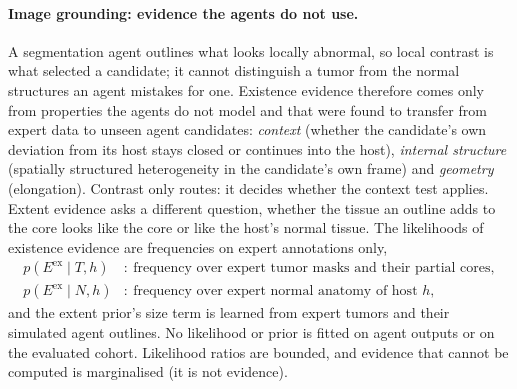 \documentclass[fleqn,10pt]{olplainarticle}
\begin{document}
\paragraph{Image grounding: evidence the agents do not use.}
A segmentation agent outlines what looks locally abnormal, so local contrast is what selected a candidate; it cannot
distinguish a tumor from the normal structures an agent mistakes for one. Existence evidence therefore comes only from
properties the agents do not model and that were found to transfer from expert data to unseen agent candidates:
\emph{context} (whether the candidate's own deviation from its host stays closed or continues into the host),
\emph{internal structure} (spatially structured heterogeneity in the candidate's own frame) and \emph{geometry}
(elongation). Contrast only routes: it decides whether the context test applies. Extent evidence asks a different
question, whether the tissue an outline adds to the core looks like the core or like the host's normal tissue. The
likelihoods of existence evidence are frequencies on expert annotations only,
\begin{equation}
\label{eq:likelihoods}
\begin{aligned}
p(E^{\mathrm{ex}}\mid T,h)&:\ \text{frequency over expert tumor masks and their partial cores},\\
p(E^{\mathrm{ex}}\mid N,h)&:\ \text{frequency over expert normal anatomy of host }h,
\end{aligned}
\end{equation}
and the extent prior's size term is learned from expert tumors and their simulated agent outlines. No likelihood or prior
is fitted on agent outputs or on the evaluated cohort. Likelihood ratios are bounded, and evidence that cannot be
computed is marginalised (it is not evidence).
\end{document}
